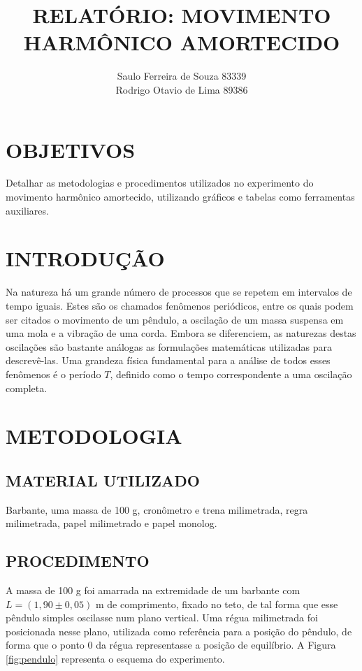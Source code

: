 \documentclass[10pt]{article}
\begin{document}
	

\title{\uppercase{\textbf{Relatório: Movimento Harmônico Amortecido}}}
\author{Saulo Ferreira de Souza 83339 \protect\\ Rodrigo Otavio de Lima 89386}
\maketitle

\setlength{\parindent}{2cm}

\section{OBJETIVOS}

Detalhar as metodologias e procedimentos utilizados no experimento do movimento harmônico amortecido, utilizando gráficos e tabelas como ferramentas auxiliares.

\section{INTRODUÇÃO}

Na natureza há um grande número de processos que se repetem em intervalos de tempo iguais. Estes são os chamados fenômenos periódicos, entre os quais podem ser citados o movimento de um pêndulo, a oscilação de um massa suspensa em uma mola e a vibração de uma corda. Embora se diferenciem, as naturezas destas oscilações são bastante análogas as formulações matemáticas utilizadas para descrevê-las. Uma grandeza física fundamental para a análise de todos esses fenômenos é o período $T$, definido como o tempo correspondente a uma oscilação completa.

\section{METODOLOGIA}

\subsection{MATERIAL UTILIZADO}

Barbante, uma massa de 100 g, cronômetro e trena milimetrada, regra milimetrada, papel milimetrado e papel monolog.

\subsection{PROCEDIMENTO}

A massa de 100 g foi amarrada na extremidade de um barbante com $L = (1,90 \pm 0,05)$ m de comprimento, fixado no teto, de tal forma que esse pêndulo simples oscilasse num plano vertical. Uma régua milimetrada foi posicionada nesse plano, utilizada como referência para a posição do pêndulo, de forma que o ponto 0 da régua representasse a posição de equilíbrio. A Figura \ref{fig:pendulo} representa o esquema do experimento.
\end{document}
